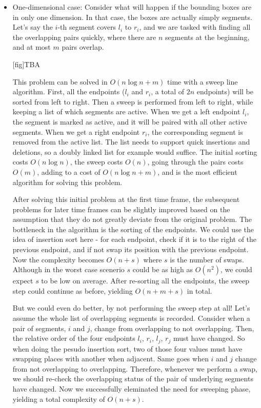 \documentclass[12pt,a4paper,twoside,openright]{report}
\begin{document}
\begin{itemize}
\item One-dimensional case: Consider what will happen if the bounding boxes are in only one dimension. In that case, the boxes are actually simply segments. Let's say the $i$-th segment covers $l_i$ to $r_i$, and we are tasked with finding all the overlapping pairs quickly, where there are $n$ segments at the beginning, and at most $m$ pairs overlap.

[fig]TBA

This problem can be solved in $O(n \log n + m)$ time with a sweep line algorithm. First, all the endpoints ($l_i$ and $r_i$, a total of $2n$ endpoints) will be sorted from left to right. Then a sweep is performed from left to right, while keeping a list of which segments are active. When we get a left endpoint $l_i$, the segment is marked as active, and it will be paired with all other active segments. When we get a right endpoint $r_i$, the corresponding segment is removed from the active list. The list needs to support quick insertions and deletions, so a doubly linked list for example would suffice. The initial sorting costs $O(n\log n)$, the sweep costs $O(n)$, going through the pairs costs $O(m)$, adding to a cost of $O(n\log n + m)$, and is the most efficient algorithm for solving this problem.

After solving this initial problem at the first time frame, the subsequent problems for later time frames can be slightly improved based on the assumption that they do not greatly deviate from the original problem. The bottleneck in the algorithm is the sorting of the endpoints. We could use the idea of insertion sort here - for each endpoint, check if it is to the right of the previous endpoint, and if not swap its position with the previous endpoint. Now the complexity becomes $O(n + s)$ where $s$ is the number of swaps. Although in the worst case scenerio $s$ could be as high as $O(n^2)$, we could expect $s$ to be low on average. After re-sorting all the endpoints, the sweep step could continue as before, yielding $O(n + m + s)$ in total.

But we could even do better, by not performing the sweep step at all! Let's assume the whole list of overlapping segments is recorded. Consider when a pair of segments, $i$ and $j$, change from overlapping to not overlapping. Then, the relative order of the four endpoints $l_i$, $r_i$, $l_j$, $r_j$ must have changed. So when doing the pesudo insertion sort, two of those four values must have swapping places with another when adjacent. Same goes when $i$ and $j$ change from not overlapping to overlapping. Therefore, whenever we perform a swap, we should re-check the overlapping status of the pair of underlying segments have changed. Now we successfully eleminated the need for sweeping phase, yielding a total complexity of $O(n + s)$.


\end{itemize}
\end{document}
